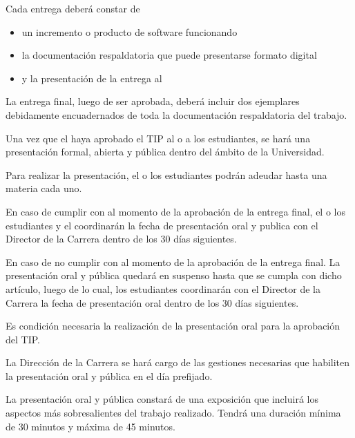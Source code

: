 
\articulo Cada entrega deberá constar de
\begin{itemize}
 \item un incremento o producto de software funcionando
 \item la documentación respaldatoria que puede presentarse formato digital
 \item y la presentación de la entrega al \profesorTIP{}
\end{itemize}


\articulo La entrega final, luego de ser aprobada, deberá incluir dos ejemplares
debidamente encuadernados de toda la documentación respaldatoria del trabajo.


\articulo Una vez que el \profesorTIP{} haya aprobado el TIP al o a los estudiantes, 
se hará una presentación formal, abierta y pública dentro del ámbito de la Universidad. 

\articulo Para realizar la presentación, el o los estudiantes podrán adeudar
hasta una materia cada uno.

\articulo En caso de cumplir con \artCondPresentacion al momento de la
aprobación de la entrega final, el o los estudiantes y el \profesorTIP{}
coordinarán la fecha de presentación oral y publica con el Director de la
Carrera dentro de los 30 días siguientes.

\articulo En caso de no cumplir con \artCondPresentacion al momento de la
aprobación de la entrega final. La presentación oral y pública quedará en
suspenso hasta que se cumpla con dicho artículo, luego de lo cual, los estudiantes coordinarán con el
Director de la Carrera la fecha de presentación oral dentro de los 30 días
siguientes.

\articulo Es condición necesaria la realización de la presentación oral para la
aprobación  del TIP.

\articulo La Dirección de la Carrera se hará cargo de las gestiones
necesarias que habiliten la presentación oral y pública en el día prefijado.

\articulo La presentación oral y pública constará de una exposición que incluirá
los aspectos más sobresalientes del trabajo realizado. Tendrá una duración mínima de
30 minutos y máxima de 45 minutos.

